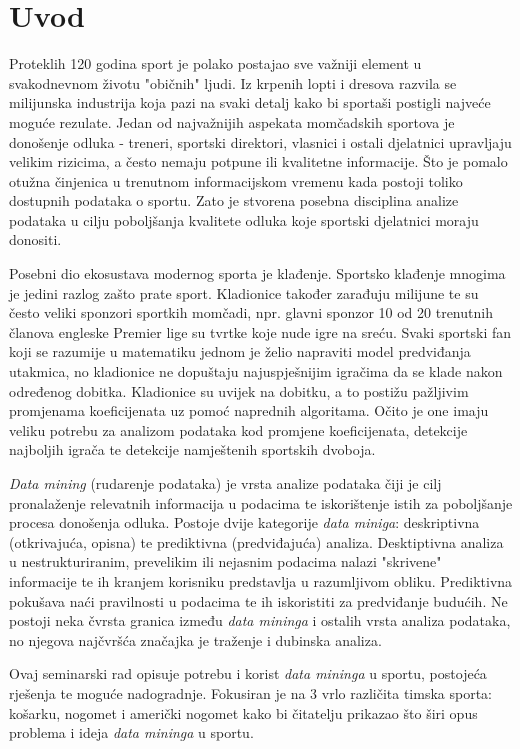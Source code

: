 \documentclass{ferseminar}
\begin{document}
\stvoripredstranice
\section{Uvod}

Proteklih 120 godina sport je polako postajao sve važniji element u svakodnevnom životu "običnih" ljudi. Iz krpenih lopti i dresova razvila se milijunska industrija koja pazi na svaki detalj kako bi sportaši postigli najveće moguće rezulate. Jedan od najvažnijih aspekata momčadskih sportova je donošenje odluka - treneri, sportski direktori, vlasnici i ostali djelatnici upravljaju velikim rizicima, a često nemaju potpune ili kvalitetne informacije. Što je pomalo otužna činjenica u trenutnom informacijskom vremenu kada postoji toliko dostupnih podataka o sportu. Zato je stvorena posebna disciplina analize podataka u cilju poboljšanja kvalitete odluka koje sportski djelatnici moraju donositi.


Posebni dio ekosustava modernog sporta je klađenje. Sportsko klađenje mnogima je jedini razlog zašto prate sport. Kladionice također zarađuju milijune te su često veliki sponzori sportkih momčadi, npr. glavni sponzor 10 od 20 trenutnih članova engleske Premier lige su tvrtke koje nude igre na sreću. Svaki sportski fan koji se razumije u matematiku jednom je želio napraviti model predviđanja utakmica, no kladionice ne dopuštaju najuspješnijim igračima da se klade nakon određenog dobitka. Kladionice su uvijek na dobitku, a to postižu pažljivim promjenama koeficijenata uz pomoć naprednih algoritama. Očito je one imaju veliku potrebu za analizom podataka kod promjene koeficijenata, detekcije najboljih igrača te detekcije namještenih sportskih dvoboja.


\textit{Data mining} (rudarenje podataka) je vrsta analize podataka čiji je cilj pronalaženje relevatnih informacija u podacima te iskorištenje istih za poboljšanje procesa donošenja odluka. Postoje dvije kategorije \textit{data miniga}: deskriptivna (otkrivajuća, opisna) te prediktivna (predviđajuća) analiza. Desktiptivna analiza u nestrukturiranim, prevelikim ili nejasnim podacima nalazi "skrivene" informacije te ih kranjem korisniku predstavlja u razumljivom obliku. Prediktivna pokušava naći pravilnosti u podacima te ih iskoristiti za predviđanje budućih. Ne postoji neka čvrsta granica između \textit{data mininga} i ostalih vrsta analiza podataka, no njegova najčvršća značajka je traženje i dubinska analiza.


Ovaj seminarski rad opisuje potrebu i korist \textit{data mininga} u sportu, postojeća rješenja te moguće nadogradnje. Fokusiran je na 3 vrlo različita timska sporta: košarku, nogomet i američki nogomet kako bi čitatelju prikazao što širi opus problema i ideja \textit{data mininga} u sportu.
\end{document}
